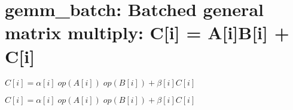 \hypertarget{group__gemm__batch}{}\section{gemm\+\_\+batch\+: Batched general matrix multiply\+: C\mbox{[}i\mbox{]} = A\mbox{[}i\mbox{]}B\mbox{[}i\mbox{]} + C\mbox{[}i\mbox{]}}
\label{group__gemm__batch}


$ C[i] = \alpha[i] \;op(A[i]) \;op(B[i]) + \beta[i] C[i] $  


$ C[i] = \alpha[i] \;op(A[i]) \;op(B[i]) + \beta[i] C[i] $ 

